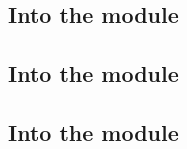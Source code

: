 \subsection{Into the \addMod{} module}                   \label{oob: lookups: add}
\subsection{Into the \modMod{} module}                   \label{oob: lookups: mod}
\subsection{Into the \wcpMod{} module}                   \label{oob: lookups: wcp}
